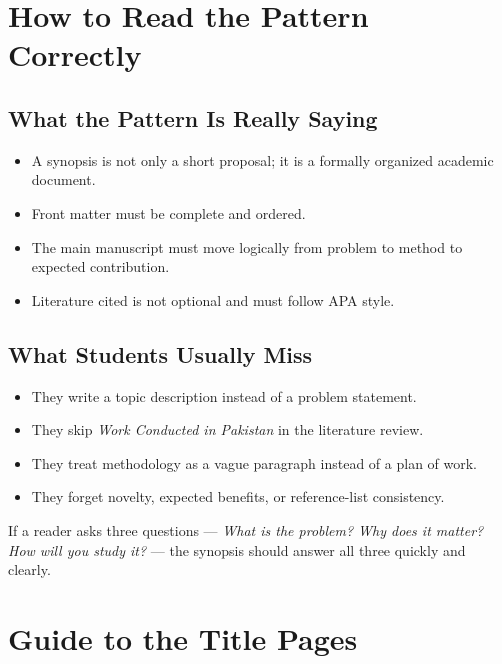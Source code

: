 \documentclass[11pt,a4paper]{article}
\begin{document}
\section{How to Read the Pattern Correctly}

\subsection{What the Pattern Is Really Saying}

\begin{itemize}[leftmargin=*]
  \item A synopsis is not only a short proposal; it is a formally organized academic document.
  \item Front matter must be complete and ordered.
  \item The main manuscript must move logically from problem to method to expected contribution.
  \item Literature cited is not optional and must follow APA style.
\end{itemize}

\subsection{What Students Usually Miss}

\begin{itemize}[leftmargin=*]
  \item They write a topic description instead of a problem statement.
  \item They skip \emph{Work Conducted in Pakistan} in the literature review.
  \item They treat methodology as a vague paragraph instead of a plan of work.
  \item They forget novelty, expected benefits, or reference-list consistency.
\end{itemize}

\begin{examplebox}
If a reader asks three questions --- \emph{What is the problem? Why does it matter? How will you study it?} --- the synopsis should answer all three quickly and clearly.
\end{examplebox}

\section{Guide to the Title Pages}
\end{document}
